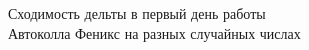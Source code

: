 \documentclass[aspectratio=169]{beamer}
\begin{document}
 \begin{frame}{Сходимость дельты в первый день работы \\ Автоколла Феникс на разных случайных числах}
\begin{figure}[h!]
\begin{minipage}[h!]{0.49\linewidth}
\end{minipage}
\hfill
\begin{minipage}[h!]{0.49\linewidth}
\end{minipage}

\label{ris:image1}
\end{figure}
 \end{frame} 
\end{document}
